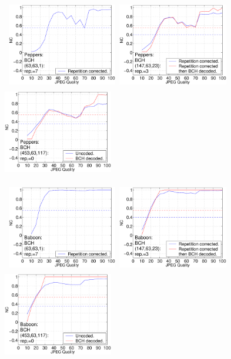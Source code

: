 \documentclass[12pt]{report}
\begin{document}
\begin{figure}[p]
\centerline{ \hbox{
\includegraphics[height=3.81cm,width=4.8cm]{EPS_BK_formattedBetter/ml63pep63.eps}
\includegraphics[height=3.81cm,width=4.8cm]{EPS_BK_formattedBetter/ml63pep147.eps}
\includegraphics[height=3.81cm,width=4.8cm]{EPS_BK_formattedBetter/ml63pep453.eps}
}}
 
\centerline{ \hbox{
\includegraphics[height=3.81cm,width=4.8cm]{EPS_BK_formattedBetter/ml63bab63.eps}
\includegraphics[height=3.81cm,width=4.8cm]{EPS_BK_formattedBetter/ml63bab147.eps}
\includegraphics[height=3.81cm,width=4.8cm]{EPS_BK_formattedBetter/ml63bab453.eps}
}}
 

\end{figure}
\end{document}

